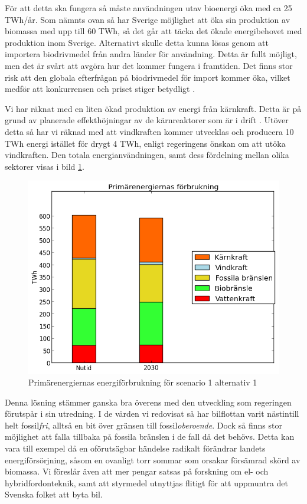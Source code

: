 \documentclass[a4paper,11pt,fleqn, titlepage]{article}
\begin{document}
För att detta ska fungera så måste användningen utav bioenergi öka med ca
25 TWh/år. Som nämnts ovan så har Sverige möjlighet att öka sin produktion
av biomassa med upp till 60 TWh, så det går att täcka det ökade
energibehovet med produktion inom Sverige. Alternativt skulle detta kunna
lösas genom att importera biodrivmedel från andra länder för användning.
Detta är fullt möjligt, men det är svårt att avgöra hur det kommer fungera
i framtiden. Det finns stor risk att den globala efterfrågan på
biodrivmedel för import kommer öka, vilket medför att konkurrensen och
priset stiger betydligt \cite{fossilfrihet}.

Vi har räknat med en liten ökad produktion av energi från kärnkraft. Detta
är på grund av planerade effekthöjningar av de kärnreaktorer som är i
drift \cite{energimyndigheten}. Utöver detta så har vi räknad med att
vindkraften kommer utvecklas och producera 10 TWh energi istället för drygt
4 TWh, enligt regeringens önskan om att utöka vindkraften. Den totala
energianvändningen, samt dess fördelning mellan olika sektorer visas
i bild \ref{fig:scen1a1energidiagram}.

\begin{figure}[h!]
       \centering
       \includegraphics[scale=0.7]{scen1a1energidiagram.png}
       \caption{Primärenergiernas energiförbrukning för scenario 1 alternativ 1}
       \label{fig:scen1a1energidiagram}
\end{figure}

Denna lösning stämmer ganska bra överens med den utveckling som regeringen förutspår i sin utredning. I de värden vi redovisat så har bilflottan varit nästintill helt fossil\textit{fri}, alltså en bit över gränsen till fossil\textit{oberoende}. Dock så finns stor möjlighet att falla tillbaka på fossila bränslen i de fall då det behövs. Detta kan vara till exempel då en oförutsägbar händelse radikalt förändrar landets energiförsörjning, såsom en ovanligt torr sommar som orsakar försämrad skörd av biomassa. Vi föreslår även att mer pengar satsas på forskning om el- och hybridfordonteknik, samt att styrmedel utnyttjas flitigt för att uppmuntra det Svenska folket att byta bil.
\end{document}
